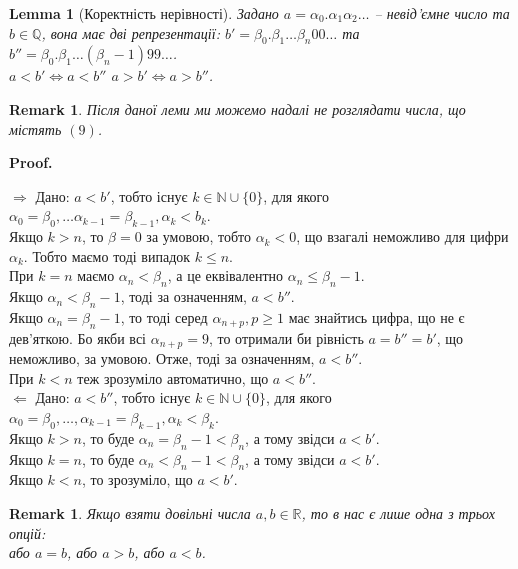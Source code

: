 \documentclass[a4paper, 14pt]{article}
\makeatletter
\def\qed{$\blacksquare$}
\def\rightproof{$\boxed{\Rightarrow}$ }
\def\leftproof{$\boxed{\Leftarrow}$ }
\theoremstyle{theoremdd}
\theoremstyle{theoremdd}
\theoremstyle{theoremdd}
\theoremstyle{theoremdd}
\theoremstyle{theoremdd}
\theoremstyle{theoremdd}
\newtheorem{remark}[theorem]{Remark}
\theoremstyle{theoremdd}
\newtheorem{lemma}[theorem]{Lemma}
\theoremstyle{theoremdd}
\renewenvironment{proof}[1][Proof.\\]{\par
\pushQED{\hfill \qed}%
\normalfont \topsep6\p@\@plus6\p@\relax
\trivlist
\item\relax
{\bfseries
#1\@addpunct{.}}\hspace\labelsep\ignorespaces
}{%
\popQED\endtrivlist\@endpefalse
}
\makeatother
\begin{document}
	\begin{lemma}[Коректність нерівності]
	Задано $a = \alpha_0.\alpha_1 \alpha_2 \dots$ -- невід'ємне число та $b \in \mathbb{Q}$, вона має дві репрезентації: $b' = \beta_0.\beta_1\dots \beta_n 00\dots$ та $b'' = \beta_0.\beta_1\dots (\beta_n-1) 99 \dots$.\\
	$a < b' \iff a < b''$ \quad $a > b' \iff a > b''$.
	\end{lemma}
	
	\begin{remark}
	Після даної леми ми можемо надалі не розглядати числа, що містять $(9)$.
	\end{remark}
	
	\begin{proof}
	\rightproof Дано: $a < b'$, тобто існує $k \in \mathbb{N} \cup \{0\}$, для якого $\alpha_0 = \beta_0, \dots \alpha_{k-1} = \beta_{k-1}, \alpha_k < b_k$.\\
	Якщо $k > n$, то $\beta = 0$ за умовою, тобто $\alpha_k < 0$, що взагалі неможливо для цифри $\alpha_k$. Тобто маємо тоді випадок $k \leq n$.\\
	При $k = n$ маємо $\alpha_n < \beta_n$, а це еквівалентно $\alpha_n \leq \beta_n-1$.\\
	Якщо $\alpha_n < \beta_n - 1$, тоді за означенням, $a < b''$.\\
	Якщо $\alpha_n = \beta_n - 1$, то тоді серед $\alpha_{n+p}, p \geq 1$ має знайтись цифра, що не є дев'яткою. Бо якби всі $\alpha_{n+p} = 9$, то отримали би рівність $a = b'' = b'$, що неможливо, за умовою. Отже, тоді за означенням, $a < b''$.\\
	При $k < n$ теж зрозуміло автоматично, що $a < b''$.
	\bigskip \\
	\leftproof Дано: $a < b''$, тобто існує $k \in \mathbb{N} \cup \{0\}$, для якого $\alpha_0 = \beta_0, \dots, \alpha_{k-1} = \beta_{k-1}, \alpha_k < \beta_k$.\\
	Якщо $k > n$, то буде $\alpha_n = \beta_n - 1 < \beta_n$, а тому звідси $a < b'$.\\
	Якщо $k = n$, то буде $\alpha_n < \beta_n - 1 < \beta_n$, а тому звідси $a < b'$.\\
	Якщо $k < n$, то зрозуміло, що $a < b'$.
	\end{proof}
	
	\begin{remark}
	Якщо взяти довільні числа $a,b \in \mathbb{R}$, то в нас є лише одна з трьох опцій: \\ або $a = b$, або $a > b$, або $a < b$.
	\end{remark}
	
\end{document}
